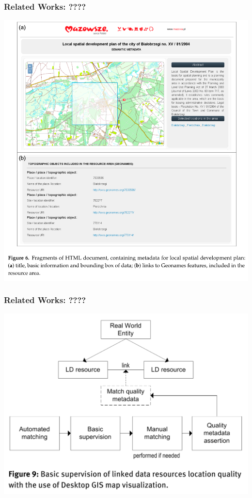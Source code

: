\documentclass[10pt]{beamer}
\begin{document}
\begin{frame}
  \frametitle{Related Works: ????}
  \centering
  \includegraphics[width=0.7\linewidth]{integrating-og.png}
\end{frame}

\begin{frame}
  \frametitle{Related Works: ????}
  \centering
  \includegraphics[width=0.7\linewidth]{deducing-rels.png}
\end{frame}
\end{document}
